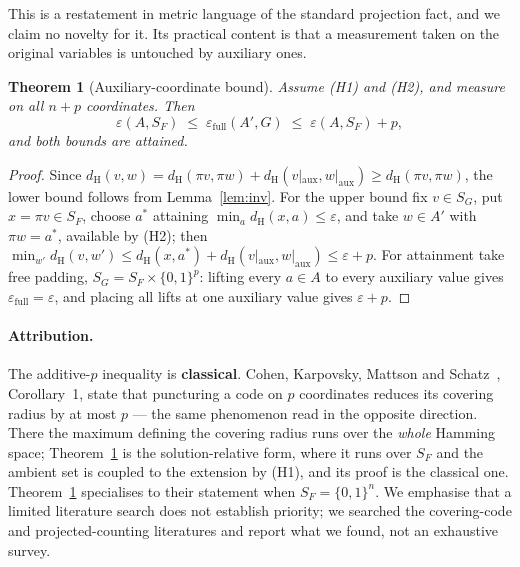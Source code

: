 \documentclass[11pt,a4paper]{article}
\theoremstyle{plain}
\newtheorem{theorem}{Theorem}
\theoremstyle{definition}
\theoremstyle{remark}
\newcommand{\dH}{d_{\mathrm{H}}}
\newcommand{\SF}{S_F}
\begin{document}
This is a restatement in metric language of the standard projection fact, and we
claim no novelty for it. Its practical content is that a measurement taken on
the original variables is untouched by auxiliary ones.

\begin{theorem}[Auxiliary-coordinate bound]\label{thm:D}
Assume \textup{(H1)} and \textup{(H2)}, and measure on all $n+p$ coordinates.
Then
\[
  \varepsilon(A,\SF) \;\le\; \varepsilon_{\mathrm{full}}(A',G)
  \;\le\; \varepsilon(A,\SF) + p ,
\]
and both bounds are attained.
\end{theorem}
\begin{proof}
Since $\dH(v,w) = \dH(\pi v,\pi w) + \dH(v|_{\mathrm{aux}}, w|_{\mathrm{aux}})
\ge \dH(\pi v,\pi w)$, the lower bound follows from Lemma~\ref{lem:inv}. For the
upper bound fix $v \in S_G$, put $x = \pi v \in \SF$, choose $a^\ast$ attaining
$\min_a \dH(x,a) \le \varepsilon$, and take $w \in A'$ with $\pi w = a^\ast$,
available by (H2); then
$\min_{w'} \dH(v,w') \le \dH(x,a^\ast) + \dH(v|_{\mathrm{aux}},w|_{\mathrm{aux}})
\le \varepsilon + p$. For attainment take free padding,
$S_G = \SF \times \{0,1\}^p$: lifting every $a \in A$ to every auxiliary value
gives $\varepsilon_{\mathrm{full}} = \varepsilon$, and placing all lifts at one
auxiliary value gives $\varepsilon + p$.
\end{proof}

\paragraph{Attribution.}
The additive-$p$ inequality is \textbf{classical}. Cohen, Karpovsky, Mattson and
Schatz~\cite{cohen1985covering}, Corollary~1, state that puncturing a code on
$p$ coordinates reduces its covering radius by at most $p$ --- the same
phenomenon read in the opposite direction. There the maximum defining the
covering radius runs over the \emph{whole} Hamming space; Theorem~\ref{thm:D} is
the solution-relative form, where it runs over $\SF$ and the ambient set is
coupled to the extension by (H1), and its proof is the classical one.
Theorem~\ref{thm:D} specialises to their statement when $\SF = \{0,1\}^n$. We
emphasise that a limited literature search does not establish priority; we
searched the covering-code and projected-counting literatures and report what we
found, not an exhaustive survey.
\end{document}
